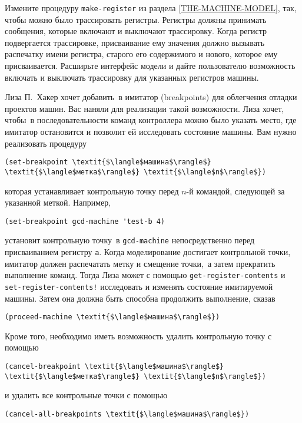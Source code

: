 \begin{exercise}{5.18}%
\label{EX5.18}%
% 
%
%
Измените процедуру {\tt make-register} из раздела
\ref{THE-MACHINE-MODEL}, так, чтобы можно было
трассировать регистры.  Регистры должны принимать сообщения, которые
включают и выключают трассировку.  Когда регистр подвергается
трассировке, присваивание ему значения должно вызывать распечатку
имени регистра, старого его содержимого и нового, которое ему
присваивается.  Расширьте интерфейс модели и дайте пользователю
возможность включать и выключать трассировку для указанных регистров
машины.
\end{exercise}
\begin{exercise}{5.19}%
\label{EX5.19}%
Лиза П.~Хакер хочет добавить~в имитатор 
 (breakpoints) для
облегчения отладки проектов машин.  Вас наняли для реализации такой
возможности.  Лиза хочет, чтобы~в последовательности команд
контроллера можно было указать место, где имитатор остановится
и позволит ей исследовать состояние машины.  Вам нужно реализовать
процедуру

\begin{Verbatim}[fontsize=\small]
(set-breakpoint \textit{$\langle$машина$\rangle$} \textit{$\langle$метка$\rangle$} \textit{$\langle$n$\rangle$})
\end{Verbatim}
которая устанавливает контрольную точку перед $n$-й
командой, следующей за указанной меткой.  Например,

\begin{Verbatim}[fontsize=\small]
(set-breakpoint gcd-machine 'test-b 4)
\end{Verbatim}
установит контрольную точку~в {\tt gcd-machine} непосредственно
перед присваиванием регистру {\tt a}.  Когда моделирование
достигает контрольной точки, имитатор должен 
распечатать метку и смещение точки,~а затем прекратить выполнение
команд.  Тогда Лиза может с помощью
{\tt get-register-contents} и
{\tt set-register-contents!} исследовать и изменять состояние
имитируемой машины.  Затем она должна быть способна продолжить
выполнение, сказав

\begin{Verbatim}[fontsize=\small]
(proceed-machine \textit{$\langle$машина$\rangle$})
\end{Verbatim}
Кроме того, необходимо иметь возможность удалить контрольную точку с
помощью

\begin{Verbatim}[fontsize=\small]
(cancel-breakpoint \textit{$\langle$машина$\rangle$} \textit{$\langle$метка$\rangle$} \textit{$\langle$n$\rangle$})
\end{Verbatim}
и удалить все контрольные точки с помощью

\begin{Verbatim}[fontsize=\small]
(cancel-all-breakpoints \textit{$\langle$машина$\rangle$})
\end{Verbatim}
\end{exercise}

